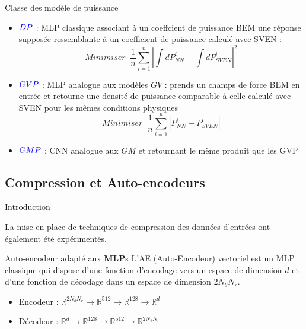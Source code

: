 \documentclass[
11pt,notheorems,hyperref={pdfauthor=whatever}
]{beamer}
\begin{document}
\begin{frame}{Classe des modèle de puissance}
\begin{itemize}
    \item $\textcolor{blue}{DP}$ : MLP classique associant à un coeffcient de puissance BEM une réponse supposée ressemblante à un coefficient de puissance calculé avec SVEN : 
    \[
       Minimiser \;\; \frac{1}{n}\sum_{i = 1}^{n}|\int dP_{NN}^i - \int dP_{SVEN}^i|^2
    \]

    \item $\textcolor{blue}{GVP}$ : MLP analogue aux modèles $GV$ : prends un champs de force BEM en entrée et retourne une densité de puissance comparable à celle calculé avec SVEN pour les mêmes conditions physiques
    \[
        Minimiser \;\; \frac{1}{n}\sum_{i = 1}^{n}|P^i_{NN} - P^i_{SVEN}|
    \]
    \item $\textcolor{blue}{GMP}$ : CNN analogue aux $GM$ et retournant le même produit que les GVP
\end{itemize}
\end{frame}

\subsection{Compression et Auto-encodeurs}

\begin{frame}{Introduction}
    \begin{center}
        La mise en place de techniques de compression des données d'entrées ont également été expérimentés.
    \end{center}
\end{frame}

\begin{frame}{Auto-encodeur adapté aux \textbf{MLP}s}
    L'AE (Auto-Encodeur) vectoriel est un MLP classique qui dispose d'une fonction d'encodage vers un espace de dimension $d$ et d'une fonction de décodage dans un espace de dimension $2N_{\theta}N_r$.
    
    \vspace{0.3cm}
    
    \begin{itemize}
        \item Encodeur : $\mathbb{R}^{2N_{\theta}N_r} \rightarrow \mathbb{R}^{512} \rightarrow \mathbb{R}^{128} \rightarrow \mathbb{R}^d$
        \item Décodeur : $\mathbb{R}^d \rightarrow \mathbb{R}^{128} \rightarrow \mathbb{R}^{512} \rightarrow \mathbb{R}^{2N_{\theta}N_r}$
    \end{itemize}
\end{frame}
\end{document}
